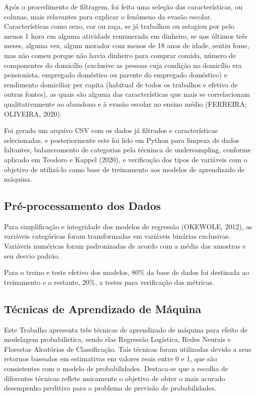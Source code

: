 \documentclass[english, spanish, brazilian]{RBIEarticle} %
\begin{document}
Após o procedimento de filtragem, foi feita uma seleção das características, ou colunas, mais relavantes para explicar o fenômeno da evasão escolar. Características como sexo, cor ou raça, se já trabalhou ou estagiou por pelo menos 1 hora em alguma atividade remunerada em dinheiro, se nos últimos três meses, alguma vez, algum morador com menos de 18 anos de idade, sentiu fome, mas não comeu porque não havia dinheiro para comprar comida, número de componentes do domicílio (exclusive as pessoas cuja condição no domicílio era pensionista, empregado doméstico ou parente do empregado doméstico) e rendimento domiciliar per capita
(habitual de todos os trabalhos e efetivo de outras fontes), as quais são alguma das características que mais se correlacionam qualitativamente ao abandono e à evasão escolar no ensino médio (FERREIRA; OLIVEIRA, 2020).

Foi gerado um arquivo CSV com os dados já filtrados e características selecionadas, e posteriormente este foi lido em Python para limpeza de dados faltantes, balanceamento de categorias pela técninca de undersampling, conforme aplicado em Teodoro e Kappel (2020), e verificação dos tipos de variáveis com o objetivo de utilizá-lo como base de treinamento aos modelos de aprendizado de máquina.


\subsection{Pré-processamento dos Dados}
Para simplificação e integridade dos modelos de regressão (OKEWOLE, 2012), as variáveis categóricas foram transformadas em variáveis binárias exclusivas. Variáveis numéricas foram padronizadas de acordo com a média das amostras e seu desvio padrão.

Para o treino e teste efetivo dos modelos, 80\% da base de dados foi destinada ao treinamento e o restante, 20\%, a testes para verificação das métricas. 

\subsection{Técnicas de Aprendizado de Máquina}
Este Trabalho apresenta três técnicas de aprendizado de máquina para efeito de modelagem probabilística, sendo elas Regressão Logística, Redes Neurais e Florestas Aleatórias de Classificação. Tais técnicas foram utilizadas devido a seus retornos baseados em estimativas em valores reais entre 0 e 1, que são consistentes com o modelo de probabilidades. Destaca-se que a escolha de diferentes técnicas reflete unicamente o objetivo de obter o mais acurado desempenho preditivo para o problema de previsão de probabilidades.
\end{document}
